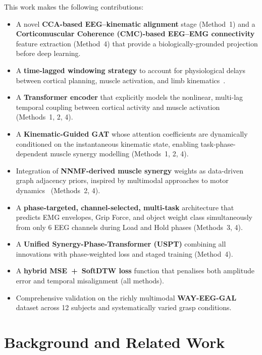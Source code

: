 \documentclass[12pt, a4paper]{article}
\begin{document}
	This work makes the following contributions:
	\begin{itemize}[itemsep=2pt]
		\item A novel \textbf{CCA-based EEG--kinematic alignment} stage (Method~1) and a \textbf{Corticomuscular Coherence (CMC)-based EEG--EMG connectivity} feature extraction (Method~4) that provide a biologically-grounded projection before deep learning.
		\item A \textbf{time-lagged windowing strategy} to account for physiological delays between cortical planning, muscle activation, and limb kinematics~\cite{esi_gal_2025}.
		\item A \textbf{Transformer encoder} that explicitly models the nonlinear,
		multi-lag temporal coupling between cortical activity and muscle
		activation (Methods~1, 2, 4).
		\item A \textbf{Kinematic-Guided GAT} whose attention coefficients are
		dynamically conditioned on the instantaneous kinematic state, enabling
		task-phase-dependent muscle synergy modelling (Methods~1, 2, 4).
		\item Integration of \textbf{NNMF-derived muscle synergy} weights as
		data-driven graph adjacency priors, inspired by multimodal approaches
		to motor dynamics~\cite{pierella2020} (Methods~2, 4).
		\item A \textbf{phase-targeted, channel-selected, multi-task} architecture
		that predicts EMG envelopes, Grip Force, and object weight class
		simultaneously from only 6 EEG channels during Load and Hold phases
		(Methods~3, 4).
		\item A \textbf{Unified Synergy-Phase-Transformer (USPT)} combining
		all innovations with phase-weighted loss and staged training (Method~4).
		\item A \textbf{hybrid MSE~+~SoftDTW loss} function that penalises both
		amplitude error and temporal misalignment (all methods).
		\item Comprehensive validation on the richly multimodal
		\textbf{WAY-EEG-GAL} dataset across 12 subjects and systematically
		varied grasp conditions.
	\end{itemize}
	
	\section{Background and Related Work}
	
\end{document}
